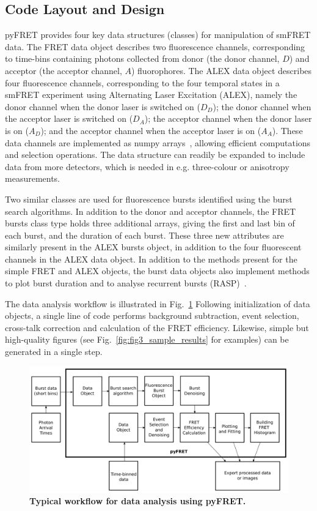 \subsection{Code Layout and Design}
pyFRET provides four key data structures (classes) for manipulation of smFRET data. The FRET data object describes two fluorescence channels, corresponding to time-bins containing photons collected from donor (the donor channel, $D$) and acceptor (the acceptor channel, $A$) fluorophores. The ALEX data object describes four fluorescence channels, corresponding to the four temporal states in a smFRET experiment using Alternating Laser Excitation (ALEX), namely the donor channel when the donor laser is switched on ($D_D$); the donor channel when the acceptor laser is switched on ($D_A$); the acceptor channel when the donor laser is on ($A_D$); and the acceptor channel when the acceptor laser is on ($A_A$). These data channels are implemented as numpy arrays~\cite{numpy}, allowing efficient computations and selection operations. The data structure can readily be expanded to include data from more detectors, which is needed in e.g. three-colour or anisotropy measurements.

Two similar classes are used for fluorescence bursts identified using the burst search algorithms. In addition to the donor and acceptor channels, the FRET bursts class type holds three additional arrays, giving the first and last bin of each burst, and the duration of each burst. These three new attributes are similarly present in the ALEX bursts object, in addition to the four fluorescent channels in the ALEX data object. In addition to the methods present for the simple FRET and ALEX objects, the burst data objects also implement methods to plot burst duration and to analyse recurrent bursts (RASP)~\cite{hoffmann11}. 

The data analysis workflow is illustrated in Fig.~\ref{fig:fig2_workflow} Following initialization of data objects, a single line of code performs background subtraction, event selection, cross-talk correction and calculation of the FRET efficiency. Likewise, simple but high-quality figures (see Fig.~\ref{fig:fig3_sample_results} for examples) can be generated in a single step.

\begin{figure}[!ht]
   \begin{center}
      \includegraphics*[clip=true, width=6in]{pyFRET/workflow.pdf}
      \caption{{\bf Typical workflow for data analysis using pyFRET.}}
      \label{fig:fig2_workflow}
   \end{center}
\end{figure}

